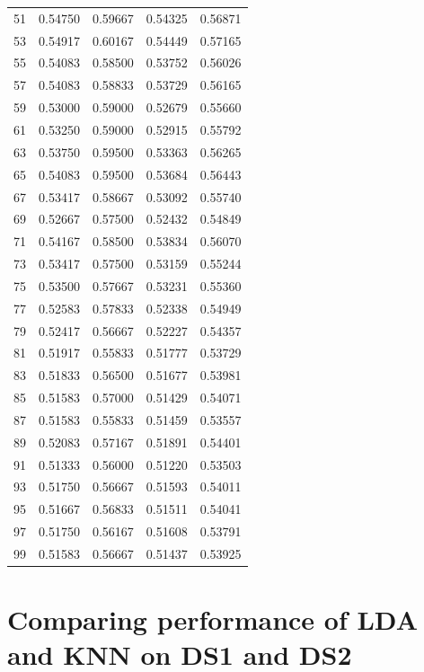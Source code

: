 \documentclass{article}
\begin{document}
\begin{center}
\begin{tabular}{ |c|c|c|c|c| }
    51 &  0.54750 &  0.59667 &  0.54325 &  0.56871 \\
    53 &  0.54917 &  0.60167 &  0.54449 &  0.57165 \\
    55 &  0.54083 &  0.58500 &  0.53752 &  0.56026 \\
    57 &  0.54083 &  0.58833 &  0.53729 &  0.56165 \\
    59 &  0.53000 &  0.59000 &  0.52679 &  0.55660 \\
    61 &  0.53250 &  0.59000 &  0.52915 &  0.55792 \\
    63 &  0.53750 &  0.59500 &  0.53363 &  0.56265 \\
    65 &  0.54083 &  0.59500 &  0.53684 &  0.56443 \\
    67 &  0.53417 &  0.58667 &  0.53092 &  0.55740 \\
    69 &  0.52667 &  0.57500 &  0.52432 &  0.54849 \\
    71 &  0.54167 &  0.58500 &  0.53834 &  0.56070 \\
    73 &  0.53417 &  0.57500 &  0.53159 &  0.55244 \\
    75 &  0.53500 &  0.57667 &  0.53231 &  0.55360 \\
    77 &  0.52583 &  0.57833 &  0.52338 &  0.54949 \\
    79 &  0.52417 &  0.56667 &  0.52227 &  0.54357 \\
    81 &  0.51917 &  0.55833 &  0.51777 &  0.53729 \\
    83 &  0.51833 &  0.56500 &  0.51677 &  0.53981 \\
    85 &  0.51583 &  0.57000 &  0.51429 &  0.54071 \\
    87 &  0.51583 &  0.55833 &  0.51459 &  0.53557 \\
    89 &  0.52083 &  0.57167 &  0.51891 &  0.54401 \\
    91 &  0.51333 &  0.56000 &  0.51220 &  0.53503 \\
    93 &  0.51750 &  0.56667 &  0.51593 &  0.54011 \\
    95 &  0.51667 &  0.56833 &  0.51511 &  0.54041 \\
    97 &  0.51750 &  0.56167 &  0.51608 &  0.53791 \\
    99 &  0.51583 &  0.56667 &  0.51437 &  0.53925 \\
	\hline
\end{tabular}
\end{center}

\section{Comparing performance of LDA and KNN on DS1 and DS2}
\end{document}

